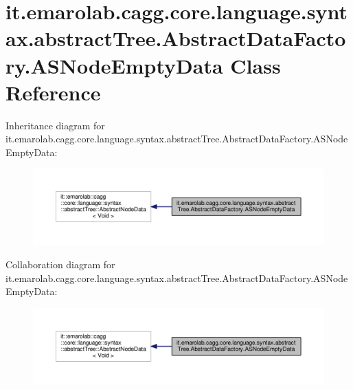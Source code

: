 \hypertarget{classit_1_1emarolab_1_1cagg_1_1core_1_1language_1_1syntax_1_1abstractTree_1_1AbstractDataFactory_1_1ASNodeEmptyData}{\section{it.\-emarolab.\-cagg.\-core.\-language.\-syntax.\-abstract\-Tree.\-Abstract\-Data\-Factory.\-A\-S\-Node\-Empty\-Data Class Reference}
\label{classit_1_1emarolab_1_1cagg_1_1core_1_1language_1_1syntax_1_1abstractTree_1_1AbstractDataFactory_1_1ASNodeEmptyData}
}


Inheritance diagram for it.\-emarolab.\-cagg.\-core.\-language.\-syntax.\-abstract\-Tree.\-Abstract\-Data\-Factory.\-A\-S\-Node\-Empty\-Data\-:\nopagebreak
\begin{figure}[H]
\begin{center}
\leavevmode
\includegraphics[width=350pt]{classit_1_1emarolab_1_1cagg_1_1core_1_1language_1_1syntax_1_1abstractTree_1_1AbstractDataFactory64b57470552b68abac64c73e3d847a4d}
\end{center}
\end{figure}


Collaboration diagram for it.\-emarolab.\-cagg.\-core.\-language.\-syntax.\-abstract\-Tree.\-Abstract\-Data\-Factory.\-A\-S\-Node\-Empty\-Data\-:\nopagebreak
\begin{figure}[H]
\begin{center}
\leavevmode
\includegraphics[width=350pt]{classit_1_1emarolab_1_1cagg_1_1core_1_1language_1_1syntax_1_1abstractTree_1_1AbstractDataFactory04d2741e546f8bc597e2910535fa6d75}
\end{center}
\end{figure}
